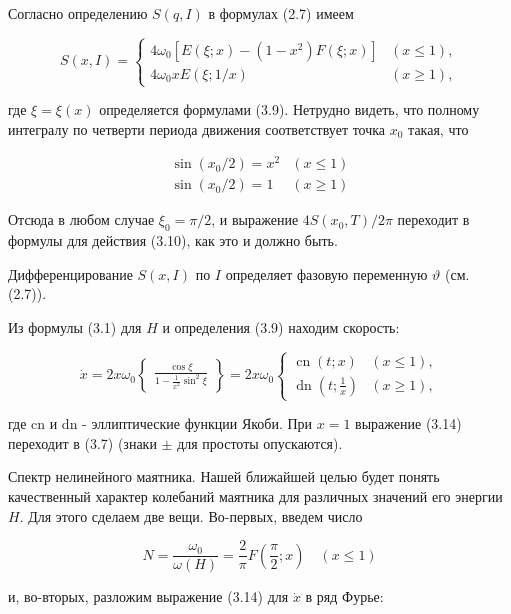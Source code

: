 \documentclass[10pt]{article}
\begin{document}
Согласно определению $S(q, I)$ в формулах (2.7) имеем

\[
S(x, I)= \begin{cases}4 \omega_{0}\left[E(\xi ; x)-\left(1-x^{2}\right) F(\xi ; x)\right] & (x \leqslant 1),  \tag{3.13}\\ 4 \omega_{0} x E(\xi ; 1 / x) & (x \geqslant 1),\end{cases}
\]

где $\xi=\xi(x)$ определяется формулами (3.9). Нетрудно видеть, что полному интегралу по четверти периода движения соответствует точка $x_{0}$ такая, что

$$
\begin{array}{ll}
\sin \left(x_{0} / 2\right)=x^{2} & (x \leqslant 1) \\
\sin \left(x_{0} / 2\right)=1 & (x \geqslant 1)
\end{array}
$$

Отсюда в любом случае $\xi_{0}=\pi / 2$, и выражение $4 S\left(x_{0}, T\right) / 2 \pi$ переходит в формулы для действия (3.10), как это и должно быть.

Дифференцирование $S(x, I)$ по $I$ определяет фазовую переменную $\vartheta$ (см. (2.7)).

Из формулы (3.1) для $H$ и определения (3.9) находим скорость:

\[
\dot{x}=2 x \omega_{0}\left\{\begin{array}{ll}
\frac{\cos \xi}{1-\frac{1}{x^{2}} \sin ^{2} \xi}
\end{array}\right\}=2 x \omega_{0} \begin{cases}\operatorname{cn}(t ; x) & (x \leqslant 1),  \tag{3.14}\\
\operatorname{dn}\left(t ; \frac{1}{x}\right) & (x \geqslant 1),\end{cases}
\]

где cn и dn - эллиптические функции Якоби. При $x=1$ выражение (3.14) переходит в (3.7) (знаки $\pm$ для простоты опускаются).

Спектр нелинейного маятника. Нашей ближайшей целью будет понять качественный характер колебаний маятника для различных значений его энергии $H$. Для этого сделаем две вещи. Во-первых, введем число


\begin{equation*}
N=\frac{\omega_{0}}{\omega(H)}=\frac{2}{\pi} F\left(\frac{\pi}{2} ; x\right) \quad(x \leqslant 1) \tag{3.15}
\end{equation*}


и, во-вторых, разложим выражение (3.14) для $\dot{x}$ в ряд Фурье:
\end{document}
